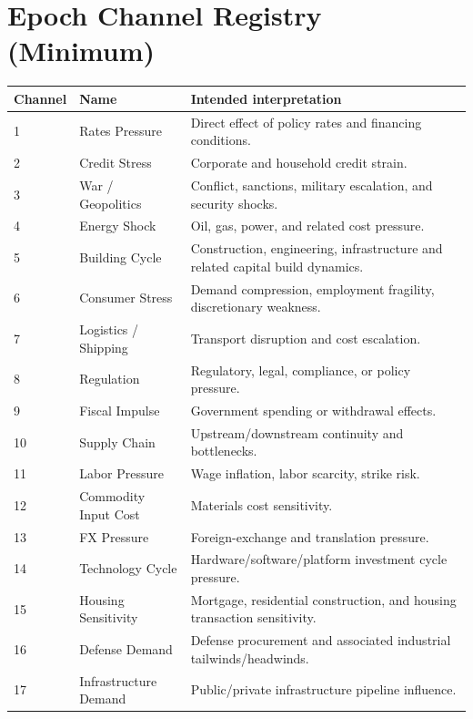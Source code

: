 \documentclass[11pt]{report}
\begin{document}
\appendix

\chapter{Epoch Channel Registry (Minimum)}
\renewcommand{\arraystretch}{1.12}
\begin{longtable}{p{}p{}p{}}
\toprule
Channel & Name & Intended interpretation \\
\midrule
1 & Rates Pressure & Direct effect of policy rates and financing conditions. \\
2 & Credit Stress & Corporate and household credit strain. \\
3 & War / Geopolitics & Conflict, sanctions, military escalation, and security shocks. \\
4 & Energy Shock & Oil, gas, power, and related cost pressure. \\
5 & Building Cycle & Construction, engineering, infrastructure and related capital build dynamics. \\
6 & Consumer Stress & Demand compression, employment fragility, discretionary weakness. \\
7 & Logistics / Shipping & Transport disruption and cost escalation. \\
8 & Regulation & Regulatory, legal, compliance, or policy pressure. \\
9 & Fiscal Impulse & Government spending or withdrawal effects. \\
10 & Supply Chain & Upstream/downstream continuity and bottlenecks. \\
11 & Labor Pressure & Wage inflation, labor scarcity, strike risk. \\
12 & Commodity Input Cost & Materials cost sensitivity. \\
13 & FX Pressure & Foreign-exchange and translation pressure. \\
14 & Technology Cycle & Hardware/software/platform investment cycle pressure. \\
15 & Housing Sensitivity & Mortgage, residential construction, and housing transaction sensitivity. \\
16 & Defense Demand & Defense procurement and associated industrial tailwinds/headwinds. \\
17 & Infrastructure Demand & Public/private infrastructure pipeline influence. \\

\end{longtable}
\end{document}
